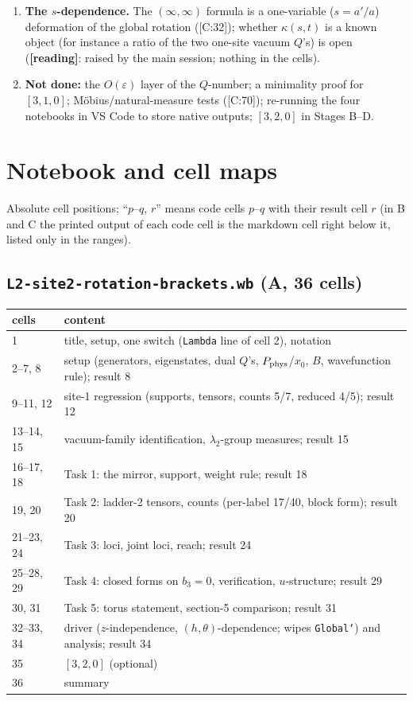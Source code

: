 \documentclass[10pt]{article}
\newcommand{\cl}[2]{\textsf{[#1:#2]}}
\newcommand{\tg}[1]{\textbf{[#1]}}
\begin{document}
\begin{enumerate}
\item \textbf{The $s$-dependence.} The $(\infty,\infty)$ formula is a one-variable ($s=a'/a$) deformation of the global rotation (\cl{C}{32}); whether $\kappa(s,t)$ is a known object (for instance a ratio of the two one-site vacuum $Q$'s) is open (\tg{reading}: raised by the main session; nothing in the cells).
\item \textbf{Not done:} the $O(\varepsilon)$ layer of the $Q$-number; a minimality proof for $[3,1,0]$; M\"obius/natural-measure tests (\cl{C}{70}); re-running the four notebooks in VS Code to store native outputs; $[3,2,0]$ in Stages B--D.
\end{enumerate}

\appendix

\section{Notebook and cell maps}\label{app:cells}

Absolute cell positions; ``$p$--$q$, $r$'' means code cells $p$--$q$ with their result cell $r$ (in B and C the printed output of each code cell is the markdown cell right below it, listed only in the ranges).

\subsection{\texttt{L2-site2-rotation-brackets.wb} (A, 36 cells)}

\begin{center}\small\setlength{\tabcolsep}{3pt}\begin{longtable}{@{}lp{13cm}@{}}\toprule
\textbf{cells} & \textbf{content} \\\midrule\endhead
1 & title, setup, one switch (\texttt{Lambda} line of cell 2), notation \\
2--7, 8 & setup (generators, eigenstates, dual $Q$'s, $P_{\rm phys}$/$x_0$, $B$, wavefunction rule); result 8 \\
9--11, 12 & site-1 regression (supports, tensors, counts 5/7, reduced 4/5); result 12 \\
13--14, 15 & vacuum-family identification, $\lambda_2$-group measures; result 15 \\
16--17, 18 & Task 1: the mirror, support, weight rule; result 18 \\
19, 20 & Task 2: ladder-2 tensors, counts (per-label 17/40, block form); result 20 \\
21--23, 24 & Task 3: loci, joint loci, reach; result 24 \\
25--28, 29 & Task 4: closed forms on $b_3=0$, verification, $u$-structure; result 29 \\
30, 31 & Task 5: torus statement, section-5 comparison; result 31 \\
32--33, 34 & driver ($z$-independence, $(h,\theta)$-dependence; wipes \texttt{Global`}) and analysis; result 34 \\
35 & $[3,2,0]$ (optional) \\
36 & summary \\\bottomrule
\end{longtable}\end{center}
\end{document}
